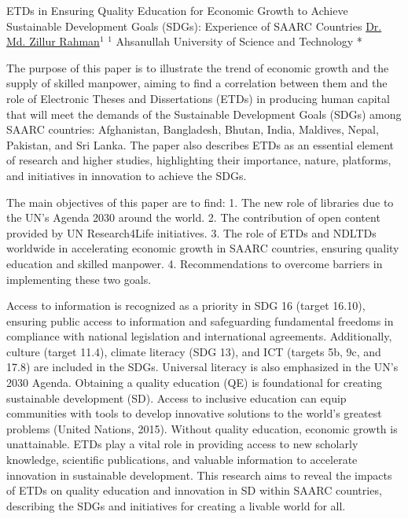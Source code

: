 \begin{abstract_online}{ETDs in Ensuring Quality Education for Economic Growth to Achieve Sustainable Development Goals (SDGs): Experience of SAARC Countries}{%
    \underline{Dr. Md. Zillur Rahman}$^{1}$}{%
    }{%
    $^1$ Ahsanullah University of Science and Technology *\newline{}
}

The purpose of this paper is to illustrate the trend of economic growth and the supply of skilled manpower, aiming to find a correlation between them and the role of Electronic Theses and Dissertations (ETDs) in producing human capital that will meet the demands of the Sustainable Development Goals (SDGs) among SAARC countries: Afghanistan, Bangladesh, Bhutan, India, Maldives, Nepal, Pakistan, and Sri Lanka. The paper also describes ETDs as an essential element of research and higher studies, highlighting their importance, nature, platforms, and initiatives in innovation to achieve the SDGs.

The main objectives of this paper are to find: 
1. The new role of libraries due to the UN's Agenda 2030 around the world.
2. The contribution of open content provided by UN Research4Life initiatives.
3. The role of ETDs and NDLTDs worldwide in accelerating economic growth in SAARC countries, ensuring quality education and skilled manpower.
4. Recommendations to overcome barriers in implementing these two goals.

Access to information is recognized as a priority in SDG 16 (target 16.10), ensuring public access to information and safeguarding fundamental freedoms in compliance with national legislation and international agreements. Additionally, culture (target 11.4), climate literacy (SDG 13), and ICT (targets 5b, 9c, and 17.8) are included in the SDGs. Universal literacy is also emphasized in the UN's 2030 Agenda. Obtaining a quality education (QE) is foundational for creating sustainable development (SD). Access to inclusive education can equip communities with tools to develop innovative solutions to the world’s greatest problems (United Nations, 2015). Without quality education, economic growth is unattainable. ETDs play a vital role in providing access to new scholarly knowledge, scientific publications, and valuable information to accelerate innovation in sustainable development. This research aims to reveal the impacts of ETDs on quality education and innovation in SD within SAARC countries, describing the SDGs and initiatives for creating a livable world for all.


\end{abstract_online}
